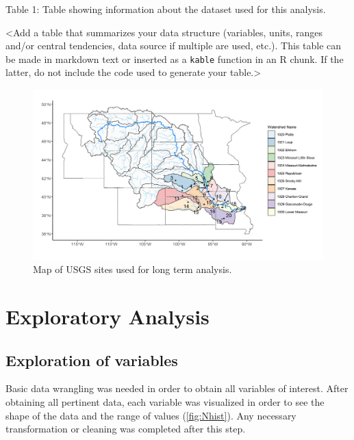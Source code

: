 \documentclass[12pt,]{article}
\makeatletter
\def\maxwidth{\ifdim\Gin@nat@width>\linewidth\linewidth\else\Gin@nat@width\fi}
\makeatother
\begin{document}
Table 1: Table showing information about the dataset used for this
analysis.

\textless{}Add a table that summarizes your data structure (variables,
units, ranges and/or central tendencies, data source if multiple are
used, etc.). This table can be made in markdown text or inserted as a
\texttt{kable} function in an R chunk. If the latter, do not include the
code used to generate your table.\textgreater{}

\begin{figure}[H]
\includegraphics[width=\maxwidth]{../Figures/site_map} \caption{\label{fig:sitemap} Map of USGS sites used for long term analysis.}\label{fig:sitemap}
\end{figure}

\newpage

\hypertarget{exploratory-analysis}{%
\section{Exploratory Analysis}\label{exploratory-analysis}}

\hypertarget{exploration-of-variables}{%
\subsection{Exploration of variables}\label{exploration-of-variables}}

Basic data wrangling was needed in order to obtain all variables of
interest. After obtaining all pertinent data, each variable was
visualized in order to see the shape of the data and the range of values
(\autoref{fig:Nhist}). Any necessary transformation or cleaning was
completed after this step.
\end{document}
